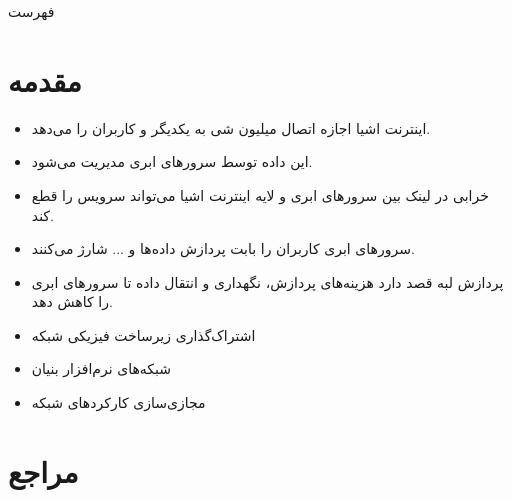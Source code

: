 \documentclass{beamer}
\makeatletter
\newcommand{\RTList}{\raggedleft\rightskip\@totalleftmargin}
\makeatother
\begin{document}
\begin{persian}
{%
  \begin{frame}
    \titlepage%
  \end{frame}
}

\begin{frame}{فهرست}
  \tableofcontents[pausesections]
\end{frame}

\section{مقدمه}

\begin{frame}{}
  \begin{itemize}\RTList
    \justifying
    \item اینترنت اشیا اجازه اتصال میلیون شی به یکدیگر و کاربران را می‌دهد.
    \item این داده توسط سرورهای ابری مدیریت می‌شود.
    \item خرابی در لینک بین سرورهای ابری و لایه اینترنت اشیا می‌تواند سرویس را قطع کند.
    \item سرورهای ابری کاربران را بابت پردازش داده‌ها و ... شارژ می‌کنند.
    \item پردازش لبه قصد دارد هزینه‌های پردازش، نگهداری و انتقال داده تا سرورهای ابری را کاهش دهد.
  \end{itemize}
\end{frame}

\begin{frame}{}
  \begin{itemize}\RTList
    \justifying
    \item اشتراک‌گذاری زیرساخت فیزیکی شبکه
    \item شبکه‌های نرم‌افزار بنیان
    \item مجازی‌سازی کارکردهای شبکه
  \end{itemize}
\end{frame}

\section{مراجع}

\begin{frame}{}
  \printbibliography%
\end{frame}

\end{persian}
\end{document}
